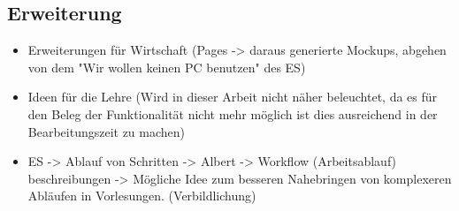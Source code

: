 \subsection{Erweiterung}\label{subsec:erweiterung}
\begin{itemize}
    \item Erweiterungen für Wirtschaft (Pages -> daraus generierte Mockups, abgehen von dem "Wir wollen keinen PC benutzen" des ES)
    \item Ideen für die Lehre (Wird in dieser Arbeit nicht näher beleuchtet, da es für den Beleg der Funktionalität nicht mehr möglich ist dies ausreichend in der Bearbeitungszeit zu machen)
    \item ES -> Ablauf von Schritten -> Albert -> Workflow (Arbeitsablauf) beschreibungen -> Mögliche Idee zum besseren Nahebringen von komplexeren Abläufen in Vorlesungen. (Verbildlichung)
\end{itemize}
